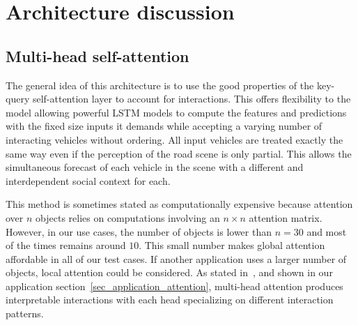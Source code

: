 \documentclass[a4paper, 10pt, conference]{ieeeconf}      %
\begin{document}
%
\section{Architecture discussion}

\subsection{Multi-head self-attention}

The general idea of this architecture is to use the good properties of the key-query self-attention layer to account for
interactions.
This offers flexibility to the model allowing powerful LSTM models to compute the features and predictions with
the fixed size inputs it demands while accepting a varying number of interacting vehicles without ordering.
All input vehicles are treated exactly the same way even if the perception of the road scene is only partial.
This allows the simultaneous forecast of each vehicle in the scene with a different and interdependent
social context for each.


This method is sometimes stated as computationally expensive because attention over $n$ objects relies on computations
involving an $n \times n$ attention matrix.
However, in our use cases, the number of objects is lower than $n=30$ and most of the times remains around $10$.
This small number makes global attention affordable in all of our test cases.
If another application uses a larger number of objects, local attention could be considered.
As stated in~\cite{Vaswani2017}, and shown in our application section~\ref{sec_application_attention}, multi-head
attention produces interpretable interactions with each head specializing on different interaction patterns.
\end{document}
